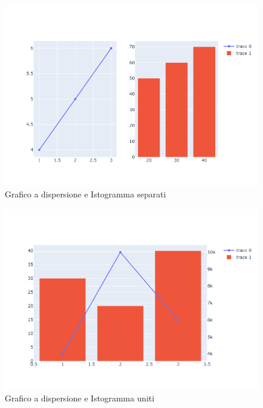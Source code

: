 \begin{figure}[h]
	\includegraphics[width=\linewidth]{plot/plotly_two_graph.png}
	\caption{Grafico a dispersione e Istogramma separati}
	\centering
	\label{fig:duePlotDistinti}
\end{figure}
\begin{figure}[h]
	\includegraphics[width=\linewidth]{plot/plot_mixed.png}
	\caption{Grafico a dispersione e Istogramma uniti}
	\centering
	\label{fig:duePlotUniti}
\end{figure}
\clearpage


